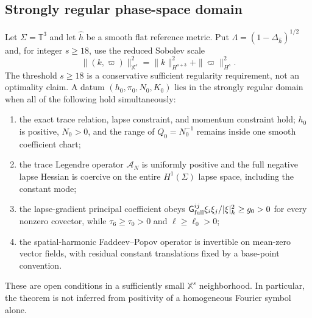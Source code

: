 \documentclass[aps,prd,reprint,onecolumn,notitlepage,nofootinbib,longbibliography,floatfix]{revtex4-2}
\theoremstyle{scstyle}
\theoremstyle{definition}
\theoremstyle{remark}
\newcommand{\AN}{\mathscr A_N}
\begin{document}
\subsection{Strongly regular phase-space domain}
Let $\Sigma=\mathbb T^3$ and let $\widehat h$ be a smooth flat reference metric.  Put $\Lambda=(1-\Delta_{\widehat h})^{1/2}$ and, for integer $s\ge18$, use the reduced Sobolev scale
\begin{equation}
 \|(k,\varpi)\|_{\mathbb X^s}^2
 =\|k\|_{H^{s+3}}^2+\|\varpi\|_{H^s}^2.
 \label{eq:compXs}
\end{equation}
The threshold $s\ge18$ is a conservative sufficient regularity requirement, not an optimality claim.  A datum $(h_0,\pi_0,N_0,K_0)$ lies in the strongly regular domain when all of the following hold simultaneously:
\begin{enumerate}[label=(R\arabic*)]
\item the exact trace relation, lapse constraint, and momentum constraint hold; $h_0$ is positive, $N_0>0$, and the range of $Q_0=N_0^{-1}$ remains inside one smooth coefficient chart;
\item the trace Legendre operator $\AN$ is uniformly positive and the full negative lapse Hessian is coercive on the entire $H^1(\Sigma)$ lapse space, including the constant mode;
\item the lapse-gradient principal coefficient obeys $\mathsf G_{\rm full}^{ij}\xi_i\xi_j/|\xi|_h^2\ge g_0>0$ for every nonzero covector, while $\tau_6\ge\tau_0>0$ and $\ell\ge\ell_0>0$;
\item the spatial-harmonic Faddeev--Popov operator is invertible on mean-zero vector fields, with residual constant translations fixed by a base-point convention.
\end{enumerate}
These are open conditions in a sufficiently small $\mathbb X^s$ neighborhood.  In particular, the theorem is not inferred from positivity of a homogeneous Fourier symbol alone.
\end{document}

